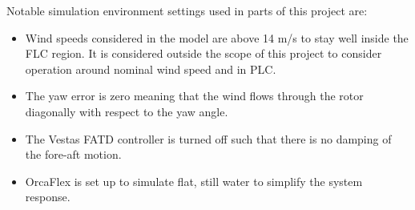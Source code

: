 \smallskip \noindent Notable simulation environment settings used in parts of this project are:
\begin{itemize}
	\item Wind speeds considered in the model are above 14 m/s to stay well inside the FLC region. It is considered outside the scope of this project to consider operation around nominal wind speed and in PLC.
	\item The yaw error is zero meaning that the wind flows through the rotor diagonally with respect to the yaw angle.
	\item The Vestas FATD controller is turned off such that there is no damping of the fore-aft motion.
	\item OrcaFlex is set up to simulate flat, still water to simplify the system response. 
\end{itemize}

